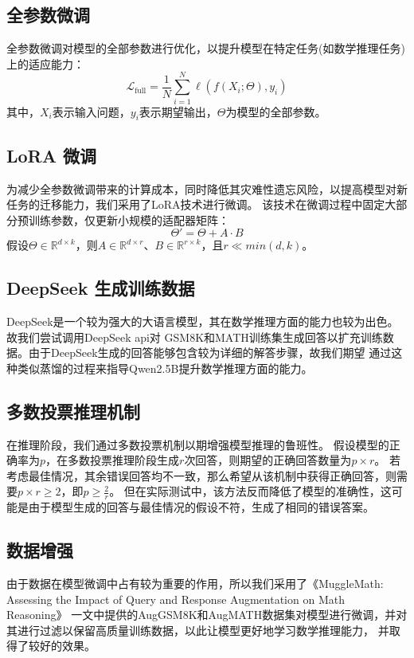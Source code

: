\documentclass{article}
\begin{document}
\subsection{全参数微调}
全参数微调对模型的全部参数进行优化，以提升模型在特定任务(如数学推理任务)上的适应能力：
$$
\mathcal{L}_{\text{full}} = \frac{1}{N} \sum_{i=1}^N \ell(f(X_i; \Theta), y_i)
$$
其中，$X_i$表示输入问题，$y_i$表示期望输出，$\Theta$为模型的全部参数。

\subsection{LoRA 微调}
为减少全参数微调带来的计算成本，同时降低其灾难性遗忘风险，以提高模型对新任务的迁移能力，我们采用了LoRA技术进行微调。
该技术在微调过程中固定大部分预训练参数，仅更新小规模的适配器矩阵：
$$
\Theta' = \Theta + A \cdot B
$$
假设$\Theta \in \mathbb{R}^{d \times k}$，则$A \in \mathbb{R}^{d \times r}$、$B \in \mathbb{R}^{r \times k}$，且$r \ll min(d, k)$。

\subsection{DeepSeek 生成训练数据}
DeepSeek是一个较为强大的大语言模型，其在数学推理方面的能力也较为出色。故我们尝试调用DeepSeek api对
GSM8K和MATH训练集生成回答以扩充训练数据。由于DeepSeek生成的回答能够包含较为详细的解答步骤，故我们期望
通过这种类似蒸馏的过程来指导Qwen2.5B提升数学推理方面的能力。

\subsection{多数投票推理机制}
在推理阶段，我们通过多数投票机制以期增强模型推理的鲁班性。
假设模型的正确率为$p$，在多数投票推理阶段生成$r$次回答，则期望的正确回答数量为$p \times r$。
若考虑最佳情况，其余错误回答均不一致，那么希望从该机制中获得正确回答，则需要$p \times r \ge 2$，即$p \ge \frac{2}{r}$。
但在实际测试中，该方法反而降低了模型的准确性，这可能是由于模型生成的回答与最佳情况的假设不符，生成了相同的错误答案。

\subsection{数据增强}
由于数据在模型微调中占有较为重要的作用，所以我们采用了《MuggleMath: Assessing the Impact of Query and Response Augmentation on Math Reasoning》
一文中提供的AugGSM8K和AugMATH数据集对模型进行微调，并对其进行过滤以保留高质量训练数据，以此让模型更好地学习数学推理能力，
并取得了较好的效果。
\end{document}
